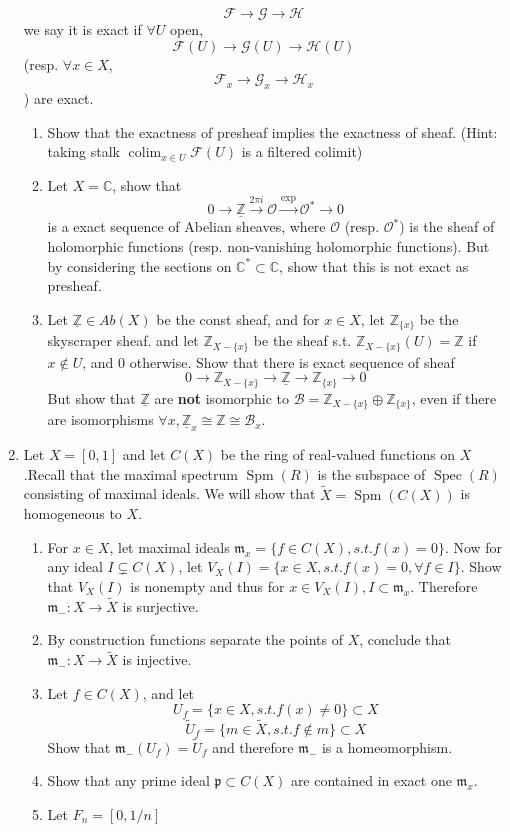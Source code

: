 \documentclass[a4paper,11pt]{article}
\def\bb#1{\mathbb{#1}}
\def\bZ{\mathbb{Z}}
\DeclareMathOperator{\colim}{colim}
\DeclareMathOperator{\Spm}{Spm}
\DeclareMathOperator{\Spec}{Spec}
\begin{document}
\begin{enumerate}[1.]
\[ \mathcal{F}\to\mathcal{G}\to\mathcal{H}\]
we say it is exact if $\forall U$ open,
\[ \mathcal{F}(U)\to\mathcal{G}(U)\to\mathcal{H}(U)\]  
(resp. $\forall x\in X$, \[ \mathcal{F}_x\to\mathcal{G}_x\to\mathcal{H}_x\]) are exact.
\begin{enumerate}
    \item Show that the exactness of presheaf implies the exactness of sheaf. (Hint: taking stalk $\colim_{x\in U}\mathcal{F}(U)$ is a filtered colimit)
    \item Let $X=\bb{C}$, show that 
    \[0\to \underline{\bZ}\xrightarrow{2\pi i}\mathcal{O}\xrightarrow{\exp} \mathcal{O}^*\to 0\]
    is a exact sequence of Abelian sheaves, where $\mathcal{O}$ (resp. $\mathcal{O}^*$) is the sheaf of holomorphic functions (resp. non-vanishing holomorphic functions). But by considering the sections on $\bb{C}^* \subset \bb{C}$, show that this is not exact as presheaf.
    \item Let $\underline{\bZ}\in Ab(X)$ be the const sheaf, and for $x\in X$, let $\bZ_{\{x\}}$ be the skyscraper sheaf. and let $\bZ_{X-\{x\}}$ be the sheaf s.t. $ \bZ_{X-\{x\}}(U)=\bZ$ if $x\notin U$, and $0$ otherwise. Show that there is exact sequence of sheaf 
    \[0\to\bZ_{X-\{x\}}\to \underline{\bZ}\to \bZ_{\{x\}}\to 0 \]
    But show that $\underline{\bZ}$ are \textbf{not} isomorphic to $\mathcal{B}=\bZ_{X-\{x\}}\oplus \bZ_{\{x\}} $, even if there are isomorphisms $\forall x, \underline{\bZ}_x\cong \bZ\cong \mathcal{B}_x$.
\end{enumerate}

\item Let $X=[0,1]$ and let $C(X)$ be the ring of real-valued functions on $X$.Recall that the maximal spectrum $\Spm(R)$ is the subspace of $\Spec(R)$ consisting of maximal ideals. We will show that $\tilde{X}=\Spm(C(X))$ is homogeneous to $X$.
\begin{enumerate}
    \item For $x\in X$, let maximal ideals $\mathfrak{m}_x=\{f\in C(X),s.t. f(x)=0\}$. Now for any ideal $I \subsetneq  C(X)$, let $V_X(I)=\{x\in X, s.t. f(x)=0, \forall f\in I\}$. Show that $V_X(I)$ is nonempty and thus for $x\in V_X(I),I\subset \mathfrak{m}_x$. Therefore $\mathfrak{m}_{-}:X\to \tilde{X}$ is surjective.
    \item By construction functions separate the points of $X$, conclude that $\mathfrak{m}_{-}: X\to \tilde{X}$ is injective.
    \item Let $f\in C(X)$, and let 
    \[U_f=\{x\in X, s.t. f(x)\neq0\}\subset X\]
    \[\tilde{U}_f=\{m\in \tilde{X}, s.t. f\notin m\}\subset X\] 
    Show that $\mathfrak{m}_{-}(U_f)=\tilde{U}_f$ and therefore $\mathfrak{m}_{-}$ is a homeomorphism.
    \item Show that any prime ideal $\mathfrak{p}\subset C(X)$ are contained in exact one $\mathfrak{m}_{x}$.
    \item Let $F_n=[0,1/n]$
\end{enumerate}


\end{enumerate}
\end{document}
